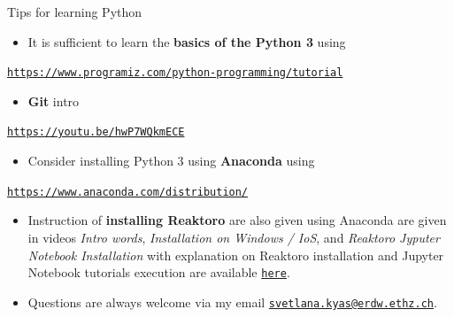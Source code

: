 \begin{frame}{Tips for learning Python}
\begin{itemize}
\item It is sufficient to learn the \alert{\textbf{basics of the Python 3}} using
\end{itemize}
\begin{center}
{\href{https://www.programiz.com/python-programming/tutorial}{\textcolor{indigo(dye)}{\tt https://www.programiz.com/python-programming/tutorial}}}{\large\par}
\par\end{center}
\begin{itemize}
\item \alert{\textbf{Git}} intro
\end{itemize}
\begin{center}
{\href{https://youtu.be/hwP7WQkmECE}{\textcolor{indigo(dye)}{\tt https://youtu.be/hwP7WQkmECE}}}{\large\par}
\par\end{center}
\begin{itemize}
\item Consider installing Python 3 using \alert{\textbf{Anaconda}} using
\end{itemize}
\begin{center}
{\href{https://www.anaconda.com/distribution/}{\textcolor{indigo(dye)}{\tt https://www.anaconda.com/distribution/}}}{\large\par}
\par\end{center}
\begin{itemize}
\item Instruction of \alert{\textbf{installing Reaktoro}} are also given using Anaconda are given in videos 
\emph{Intro words}, 
\emph{Installation on Windows / IoS}, and 
\emph{Reaktoro Jyputer Notebook Installation} with explanation on Reaktoro installation and Jupyter Notebook tutorials execution are available \href{https://polybox.ethz.ch/index.php/s/qStBnxUnry648U5}{\textcolor{indigo(dye)}{\tt here}}. 
%
\item 
Questions are always welcome via my email \href{svetlana.kyas@erdw.ethz.ch}{\textcolor{indigo(dye)}{\tt svetlana.kyas@erdw.ethz.ch}}. 
\end{itemize}

\end{frame}
%
